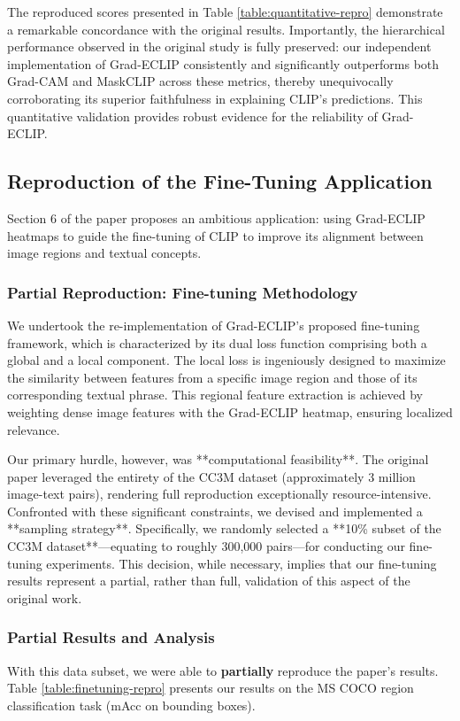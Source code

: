 \documentclass[10pt]{article} %
\begin{document}
The reproduced scores presented in Table \ref{table:quantitative-repro} demonstrate a remarkable concordance with the original results. Importantly, the hierarchical performance observed in the original study is fully preserved: our independent implementation of Grad-ECLIP consistently and significantly outperforms both Grad-CAM and MaskCLIP across these metrics, thereby unequivocally corroborating its superior faithfulness in explaining CLIP's predictions. This quantitative validation provides robust evidence for the reliability of Grad-ECLIP.

\subsection{Reproduction of the Fine-Tuning Application}

Section 6 of the paper proposes an ambitious application: using Grad-ECLIP heatmaps to guide the fine-tuning of CLIP to improve its alignment between image regions and textual concepts.

\subsubsection{Partial Reproduction: Fine-tuning Methodology}

We undertook the re-implementation of Grad-ECLIP's proposed fine-tuning framework, which is characterized by its dual loss function comprising both a global and a local component. The local loss is ingeniously designed to maximize the similarity between features from a specific image region and those of its corresponding textual phrase. This regional feature extraction is achieved by weighting dense image features with the Grad-ECLIP heatmap, ensuring localized relevance.

Our primary hurdle, however, was **computational feasibility**. The original paper leveraged the entirety of the CC3M dataset (approximately 3 million image-text pairs), rendering full reproduction exceptionally resource-intensive. Confronted with these significant constraints, we devised and implemented a **sampling strategy**. Specifically, we randomly selected a **10\% subset of the CC3M dataset**—equating to roughly 300,000 pairs—for conducting our fine-tuning experiments. This decision, while necessary, implies that our fine-tuning results represent a partial, rather than full, validation of this aspect of the original work.

\subsubsection{Partial Results and Analysis}
With this data subset, we were able to \textbf{partially} reproduce the paper's results. Table \ref{table:finetuning-repro} presents our results on the MS COCO region classification task (mAcc on bounding boxes).
\end{document}
